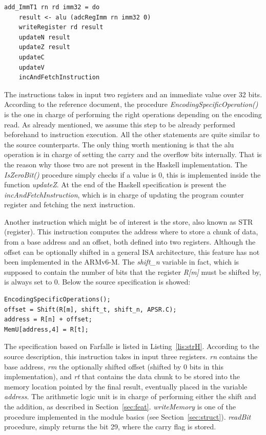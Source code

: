 \documentclass[conference]{IEEEtran}
\begin{document}
\begin{lstlisting}[caption=ADD (immediate) instruction - Farfalle specification,
frame=single, label=lis:addH]
add_ImmT1 rn rd imm32 = do
    result <- alu (adcRegImm rn imm32 0)
    writeRegister rd result
    updateN result
    updateZ result
    updateC
    updateV
    incAndFetchInstruction
\end{lstlisting}

\noindent
The instructions takes in input two registers and an immediate value over 32 bits. According
to the reference document, the procedure \textit{EncodingSpecificOperation()} is the one in
charge of performing the right operations depending on the encoding read. As already
mentioned, we assume this step to be already performed beforehand to instruction execution.
All the other statements are quite similar to the source counterparts.
The only thing worth mentioning is that the alu operation is in charge of
setting the carry and the overflow bits internally. That is the reason why those two are not
present in the Haskell implementation. The \textit{IsZeroBit()} procedure simply checks if a
value is 0, this is implemented inside the function \textit{updateZ}. At the end of the
Haskell specification is present the \textit{incAndFetchInstruction}, which is in charge of
updating the program counter register and fetching the next instruction.

Another instruction which might be of interest is the store, also known as STR (register).
This instruction computes the address where to store a chunk of data, from a base
address and an offset, both defined into two registers. Although the offset can be optionally
shifted in a general ISA architecture, this feature has not been implemented in the ARMv6-M.
The \textit{shift\_n} variable in fact, which is supposed to contain the number of bits that
the register \textit{R[m]} must be shifted by, is always set to 0. Below the source
specification is showed:\\

\begin{lstlisting}[caption=STR (register) instruction - Reference specification,
frame=single, label=lis:str]
EncodingSpecificOperations();
offset = Shift(R[m], shift_t, shift_n, APSR.C);
address = R[n] + offset;
MemU[address,4] = R[t];
\end{lstlisting}

\noindent
The specification based on Farfalle is listed in Listing~\ref{lis:strH}.
According to the source description, this instruction takes in input three registers.
\textit{rn} contains the base address, \textit{rm} the optionally shifted offset (shifted by
0 bits in this implementation), and \textit{rt} that contains the data chunk to be stored
into the memory location pointed by the final result, eventually placed in the variable
\textit{address}. The arithmetic logic unit is in charge of performing either the shift and
the addition, as described in Section~\ref{sec:feat}. \textit{writeMemory} is one of the
procedure implemented in the module basics (see Section~\ref{sec:struct}). \textit{readBit}
procedure, simply returns the bit 29, where the carry flag is stored.\\
\end{document}
